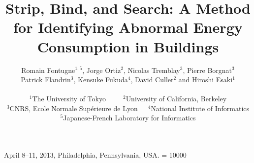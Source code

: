\documentclass{sig-alternate-ipsn13}
\title{Strip, Bind, and Search: A Method for Identifying Abnormal Energy Consumption in Buildings}
\author{
Romain Fontugne{\large$^{1,5}$}, Jorge Ortiz{\large$^2$}, Nicolas Tremblay{\large$^3$}, Pierre Borgnat{\large$^3$}
\\
Patrick Flandrin{\large$^3$}, Kensuke Fukuda{\large$^4$}, David Culler{\large$^2$} and Hiroshi Esaki{\large$^1$}
\\~\\
{\large$^1$}The University of Tokyo~~~~~{\large$^2$}University of California, Berkeley\\
{\large$^3$}CNRS, Ecole Normale Sup\'erieure de Lyon~~~{\large$^4$}National Institute of Informatics\\
{\large$^5$}Japanese-French Laboratory for Informatics
}
\begin{document}
 {April 8--11, 2013, Philadelphia, Pennsylvania, USA.} 
\widowpenalty = 10000


\maketitle



















\small


\end{document}
